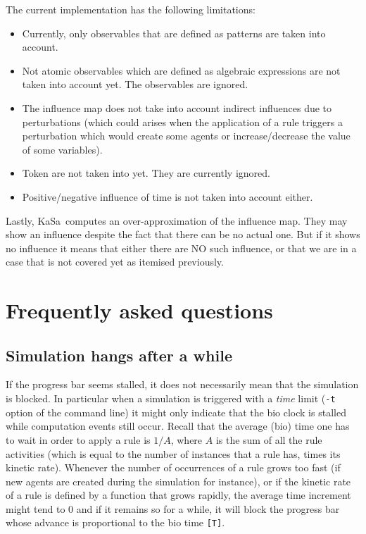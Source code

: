 \documentclass[11pt]{book}
\def\ttt#1{\texttt{#1}}
\begin{document}
The current implementation has the following limitations:
\begin{itemize}
\item Currently, only observables that are defined as patterns are taken into account. 
\item Not atomic observables which are defined as algebraic expressions are not taken into account yet. The observables are ignored. 
\item The influence map does not take into account indirect influences due to perturbations (which could arises when the application of a rule triggers a perturbation which would create some agents or increase/decrease the value of some variables). 
\item Token are not taken into yet. They are currently ignored. 
\item Positive/negative influence of time is not taken into account either. 
\end{itemize}

Lastly, KaSa\ computes an over-approximation of the influence map. They may show an influence despite the fact that there can be no actual one. But if it shows no influence it means that either there are NO such influence, or that we are in a case that is not covered yet as itemised previously. 

\chapter{Frequently asked questions}
\section*{Simulation hangs after a while}
If the progress bar seems stalled, it does not necessarily mean that the simulation is blocked. In particular when a simulation is triggered with a \emph{time} limit (\ttt{-t} option of the command line) it might only indicate that the bio clock is stalled while computation events still occur. Recall that the average (bio) time one has to wait in order to apply a rule is $1/A$, where $A$ is the sum of all the rule activities (which is equal to the number of instances that a rule has, times its kinetic rate). Whenever the number of occurrences of a rule grows too fast (if new agents are created during the simulation for instance), or if the kinetic rate of a rule is defined by a function that grows rapidly, the average time increment might tend to 0 and if it remains so for a while, it will block the progress bar whose advance is proportional to the bio time \ttt{[T]}. 
\end{document}
